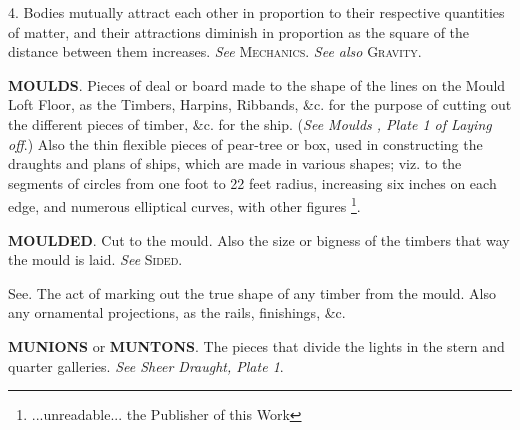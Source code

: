 4. Bodies mutually attract each other in proportion to their respective quantities of matter, and their attractions diminish in proportion as the square of the distance between them increases. \textit{See} \textsc{Mechanics}. \textit{See also} \textsc{Gravity}. 

\textbf{MOULDS}. Pieces of deal or board made to the shape of the lines on the Mould Loft Floor, as the Timbers, Harpins, Ribbands, \&c. for the purpose of cutting out the different pieces of timber, \&c. for the ship. (\textit{See Moulds , Plate 1 of Laying off}.) Also the thin flexible pieces of pear-tree or box, used in constructing the draughts and plans of ships, which are made in various shapes; viz. to the segments of circles from one foot to 22 feet radius, increasing six inches on each edge, and numerous elliptical curves, with other figures \footnote{...unreadable... the Publisher of this Work}. 

\textbf{MOULDED}. Cut to the mould. Also the size or bigness of the timbers that way the mould is laid. \textit{See} \textsc{Sided}. 

See. The act of marking out the true shape of any timber from the mould. Also any ornamental projections, as the rails, finishings, \&c. 

\textbf{MUNIONS} or \textbf{MUNTONS}. The pieces that divide the lights in the stern and quarter galleries. \textit{See Sheer Draught, Plate 1}.

